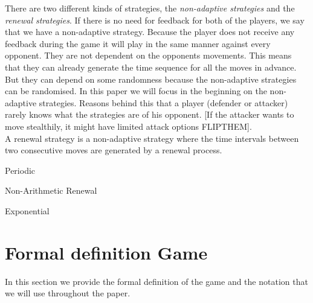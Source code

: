 There are two different kinds of strategies, the \textit{non-adaptive strategies} and the \textit{renewal strategies}. If there is no need for feedback for both of the players, we say that we have a non-adaptive strategy. Because the player does not receive any feedback during the game it will play in the same manner against every opponent. They are not dependent on the opponents movements. This means that they can already generate the time sequence for all the moves in advance.  But they can depend on some randomness because the non-adaptive strategies can be randomised. 
In this paper we will focus in the beginning on the non-adaptive strategies. Reasons behind this that a player (defender or attacker) rarely knows what the strategies are of his opponent. [If the attacker wants to move stealthily, it might have limited attack options FLIPTHEM]. \\
A renewal strategy is a non-adaptive strategy where the time intervals between two consecutive moves are generated by a renewal process. \\

 \begin{description}
 \item Periodic
 \item Non-Arithmetic Renewal
 \item Exponential
 \end{description}

\section{Formal definition Game}

In this section we provide the formal definition of the game and the notation that we will use throughout the paper.

